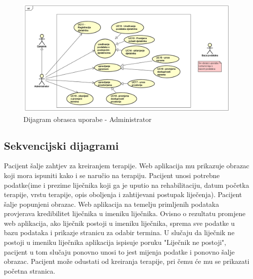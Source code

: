 					\begin{figure}[H]
						\includegraphics[scale=0.45]{slike/dijagram_obrasca_uporabe3.PNG} %
						\centering
						\caption{Dijagram obrasca uporabe - Administrator}
						\label{fig:dijagram_UC3}
					\end{figure}
					
				\eject		
				
			\subsection{Sekvencijski dijagrami}
				
				\textbf{}
				
				Pacijent šalje zahtjev za kreiranjem terapije. Web aplikacija mu prikazuje obrazac koji mora ispuniti kako i se naručio na terapiju. Pacijent unosi potrebne podatke(ime i prezime liječnika koji ga je uputio na rehabilitaciju, datum početka terapije, vrstu terapije, opis oboljenja i zahtijevani postupak liječenja). Pacijent šalje popunjeni obrazac. Web aplikacija na temelju primljenih podataka provjerava kredibilitet liječnika u imeniku liječnika. Ovisno o rezultatu promjene web aplikacija, ako liječnik postoji u imeniku liječnika, sprema sve podatke u bazu podataka i prikazje stranicu za odabir termina. U slučaju da liječnik ne postoji u imeniku liječnika aplikacija ispisuje poruku "Liječnik ne postoji", pacijent u tom slučaju ponovno unosi to jest mijenja podatke i ponovno šalje obrazac. Pacijent može odustati od kreiranja terapije, pri čemu će mu se prikazati početna stranica.
				

